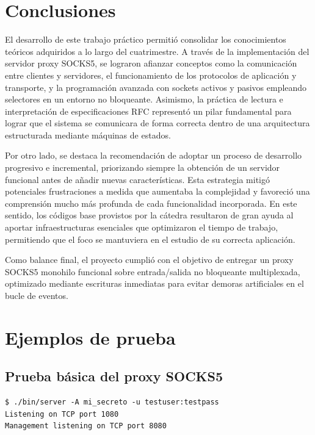 \documentclass[12pt,a4paper]{article}
\begin{document}
\section{Conclusiones}

El desarrollo de este trabajo práctico permitió consolidar los conocimientos teóricos 
adquiridos a lo largo del cuatrimestre. A través de la implementación del servidor 
proxy SOCKS5, se lograron afianzar conceptos como la comunicación entre clientes y 
servidores, el funcionamiento de los protocolos de aplicación y transporte, y la 
programación avanzada con sockets activos y pasivos empleando selectores en un entorno 
no bloqueante. Asimismo, la práctica de lectura e interpretación de especificaciones 
RFC representó un pilar fundamental para lograr que el sistema se comunicara de forma 
correcta dentro de una arquitectura estructurada mediante máquinas de estados.

Por otro lado, se destaca la recomendación de adoptar un proceso de desarrollo progresivo
e incremental, priorizando siempre la obtención de un servidor funcional antes de añadir 
nuevas características. Esta estrategia mitigó potenciales frustraciones a medida 
que aumentaba la complejidad y favoreció una comprensión mucho más profunda de cada 
funcionalidad  incorporada. En este sentido, los códigos base provistos por la cátedra 
resultaron de gran ayuda al aportar infraestructuras esenciales que optimizaron el 
tiempo de trabajo, permitiendo que el foco se mantuviera en el estudio de su correcta 
aplicación.

Como balance final, el proyecto cumplió con el objetivo de entregar un proxy SOCKS5 
monohilo funcional sobre entrada/salida no bloqueante multiplexada, optimizado mediante 
escrituras inmediatas para evitar demoras artificiales en el bucle de eventos.

\section{Ejemplos de prueba}

\subsection{Prueba básica del proxy SOCKS5}

\begin{lstlisting}[caption=Iniciar el servidor]
$ ./bin/server -A mi_secreto -u testuser:testpass
Listening on TCP port 1080
Management listening on TCP port 8080
\end{lstlisting}
\end{document}
